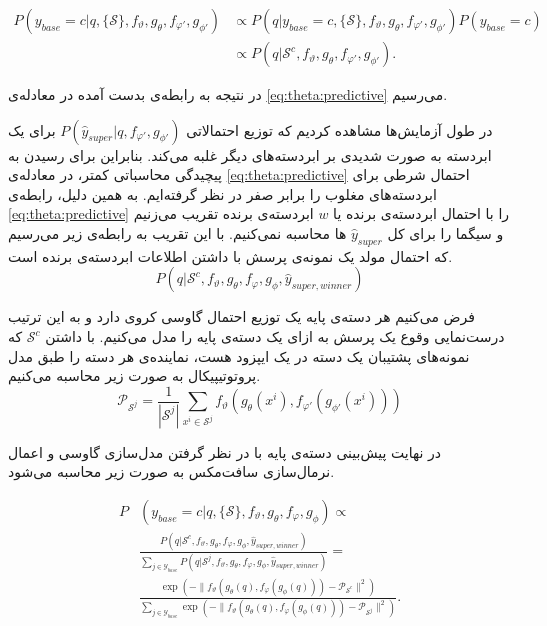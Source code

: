  \begin{equation}
 	\begin{split}
 		P(y_{base}=c|q,\{\mathcal{S}\},f_\vartheta,g_\theta,f_{\varphi'},g_{\phi'}) &\propto
 		P(q|y_{base}=c,\{\mathcal{S}\},f_\vartheta,g_\theta,f_{\varphi'},g_{\phi'})P(y_{base}=c) \\
 		&\propto P(q|\mathcal{S}^c,f_\vartheta,g_\theta,f_{\varphi'},g_{\phi'}).
 	\end{split}
 \end{equation}

در نتیجه به رابطه‌ی بدست آمده در معادله‌ی 
\ref{eq:theta:predictive}
می‌رسیم.

در طول آزمایش‌ها مشاهده کردیم که توزیع احتمالاتی 
$P(\hat{y}_{super}|q,f_{\varphi'},g_{\phi'})$
برای یک ابردسته به صورت شدیدی بر ابردسته‌های دیگر غلبه می‌کند. بنابراین برای رسیدن به پیچیدگی محاسباتی کمتر، در معادله‌ی 
\ref{eq:theta:predictive}
احتمال شرطی برای ابردسته‌های مغلوب را برابر صفر در نظر گرفته‌ایم. به همین دلیل، رابطه‌ی 
\ref{eq:theta:predictive}
را با احتمال ابردسته‌ی برنده یا 
$w$
ابردسته‌ی برنده تقریب می‌زنیم و سیگما را برای کل 
$\hat{y}_{super}$
ها محاسبه نمی‌کنیم. با این تقریب به رابطه‌ی زیر می‌رسیم که احتمال مولد یک نمونه‌‌ی پرسش با داشتن اطلاعات ابردسته‌ی برنده است.
\begin{equation}
	P(q|\mathcal{S}^c,f_\vartheta,g_\theta,f_\varphi,g_\phi,\hat{y}_{super,winner})
\end{equation}

فرض می‌کنیم هر دسته‌ی پایه یک توزیع احتمال گاوسی کروی دارد و به این ترتیب درست‌نمایی وقوع یک پرسش به ازای یک دسته‌ی پایه را مدل می‌کنیم. با داشتن 
$\mathcal{S}^c$
که نمونه‌های پشتیبان یک دسته در یک ایپزود هست، نماینده‌ی هر دسته را طبق مدل پروتوتیپیکال به صورت زیر محاسبه می‌کنیم. 
\begin{equation}
	\mathcal{P}_{\mathcal{S}^j} = \frac{1}{|\mathcal{S}^j|}\sum\limits_{x^i \in \mathcal{S}^j}f_\vartheta\left(g_\theta(x^i), f_{\varphi'}(g_{\phi'}(x^i))\right)
\end{equation}

در نهایت پیش‌بینی دسته‌ی پایه با در نظر گرفتن مدل‌سازی گاوسی و اعمال نرمال‌سازی سافت‌مکس به صورت زیر محاسبه می‌شود.

\begin{equation}
	\begin{split} \label{eq:theta:softmax}
		P&(y_{base}=c|q,\{\mathcal{S}\},f_\vartheta,g_\theta,f_\varphi,g_\phi) \propto\\
		& \frac{P(q|\mathcal{S}^c,f_\vartheta,g_\theta,f_\varphi,g_\phi,\hat{y}_{super,winner})}{\sum\limits_{j\in\mathcal{Y}_{base}} P(q|\mathcal{S}^j,f_\vartheta,g_\theta,f_\varphi,g_\phi,\hat{y}_{super,winner})} =\\
		&
		\frac{\exp\left(-\|f_\vartheta\left(g_\theta(q), f_\varphi(g_\phi(q))\right) - \mathcal{P}_{\mathcal{S}^c}\|^2\right)}{\sum\limits_{j\in\mathcal{Y}_{base}} \exp\left(-\|f_\vartheta\left(g_\theta(q), f_\varphi(g_\phi(q))\right) - \mathcal{P}_{\mathcal{S}^j}\|^2\right)}.
	\end{split}
\end{equation}

